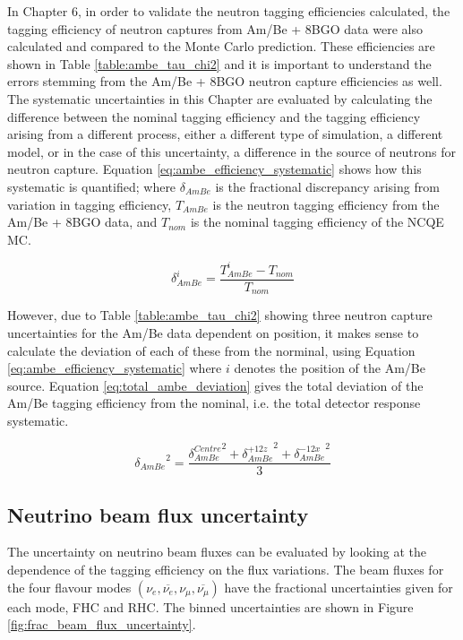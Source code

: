 In Chapter 6, in order to validate the neutron tagging efficiencies calculated, the tagging efficiency of neutron captures from Am/Be + 8BGO data were also calculated and compared to the Monte Carlo prediction. These efficiencies are shown in Table \ref{table:ambe_tau_chi2} and it is important to understand the errors stemming from the Am/Be + 8BGO neutron capture efficiencies as well. The systematic uncertainties in this Chapter are evaluated by calculating the difference between the nominal tagging efficiency and the tagging efficiency arising from a different process, either a different type of simulation, a different model, or in the case of this uncertainty, a difference in the source of neutrons for neutron capture. Equation \ref{eq:ambe_efficiency_systematic} shows how this systematic is quantified; where $\delta_{AmBe}$ is the fractional discrepancy arising from variation in tagging efficiency, $T_{AmBe}$ is the neutron tagging efficiency from the Am/Be + 8BGO data, and $T_{nom}$ is the nominal tagging efficiency of the NCQE MC. 

\begin{equation}
\delta_{AmBe}^{i}=\frac{T_{AmBe}^{i}-T_{n o m}}{T_{n o m}}
\label{eq:ambe_efficiency_systematic}
\end{equation}

However, due to Table \ref{table:ambe_tau_chi2} showing three neutron capture uncertainties for the Am/Be data dependent on position, it makes sense to calculate the deviation of each of these from the norminal, using Equation \ref{eq:ambe_efficiency_systematic} where $i$ denotes the position of the Am/Be source. Equation \ref{eq:total_ambe_deviation} gives the total deviation of the Am/Be tagging efficiency from the nominal, i.e. the total detector response systematic.

\begin{equation}
    {\delta_{AmBe}}^2= \frac{{\delta_{AmBe}^{Centre}}^2 + {\delta_{AmBe}^{+12z}}^2 + {\delta_{AmBe}^{-12x}}^2}{3} 
\label{eq:total_ambe_deviation}
\end{equation}




\subsection{Neutrino beam flux uncertainty}

The uncertainty on neutrino beam fluxes can be evaluated by looking at the dependence of the tagging efficiency on the flux variations. The beam fluxes for the four flavour modes 
$\left(\nu_{e}, \overline{\nu_{e}}, \nu_{\mu}, \overline{\nu_{\mu}}\right)$ have the fractional uncertainties given for each mode, FHC and RHC. The binned uncertainties are shown in Figure \ref{fig:frac_beam_flux_uncertainty}.


